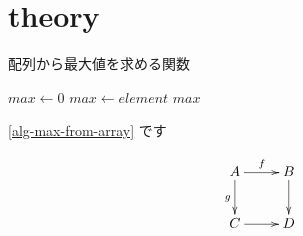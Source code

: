 \documentclass[uplatex, 10pt, a4paper, titlepage]{jsarticle}
\begin{document}
\makeatletter
\renewcommand{\ALG@name}{アルゴリズム}
\makeatother





\newpage

\newpage

\setcounter{tocdepth}{2}
\tableofcontents
\newpage

\listoftables
\listoffigures

\section{theory}

\begin{algorithm}[tb]
    \caption{配列から最大値を求める関数}
    \label{alg-max-from-array}
    \begin{algorithmic}[1]
        \State $max \gets 0$
        \State $max \gets element$
        \EndIf
        \EndFor
        \State \Return $max$
        \EndFunction
    \end{algorithmic}
\end{algorithm}

\ref{alg-max-from-array} です

\cite{vaswani2017attention}

$$
    \xymatrix{
        A \ar[r]^{f} \ar[d]_{g} & B \ar[d] \\
        C \ar[r] & D
    }
$$



\end{document}
